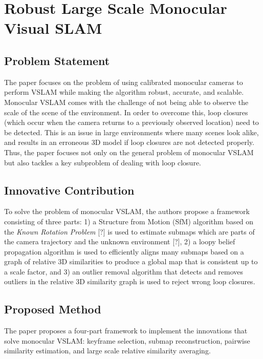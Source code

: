 \documentclass[10pt,twocolumn,letterpaper]{article}
\begin{document}
\section{Robust Large Scale Monocular Visual SLAM}

\subsection{Problem Statement}

The paper focuses on the problem of using calibrated monocular cameras to perform VSLAM while making the 
algorithm robust, accurate, and scalable.  Monocular VSLAM comes with the challenge of not being able to 
observe the scale of the scene of the environment.  In order to overcome this, loop closures 
(which occur when the camera returns to a previously observed location) need to be detected.  
This is an issue in large environments where many scenes look alike, and results in an erroneous 
3D model if loop closures are not detected properly.  Thus, the paper focuses not only on the general 
problem of monocular VSLAM but also tackles 
a key subproblem of dealing with loop closure.

\subsection{Innovative Contribution}

To solve the problem of monocular VSLAM, the authors propose a framework consisting of three parts:
1) a Structure from Motion (SfM) algorithm based on the \textit{Known Rotation Problem} [?]  
is used to estimate submaps which are parts of the camera trajectory and the unknown environment [?],
2) a loopy belief propagation algorithm is used to efficiently aligns many submaps based 
on a graph of relative 3D similarities to produce a global map that is consistent up to a scale factor, and
3) an outlier removal algorithm that detects and removes outliers in the relative 3D similarity 
graph is used to reject wrong loop closures.

\subsection{Proposed Method}
The paper proposes a four-part framework to implement the innovations that solve monocular VSLAM: 
keyframe selection, submap reconstruction, pairwise similarity estimation, and large scale 
relative similarity averaging.
\end{document}
